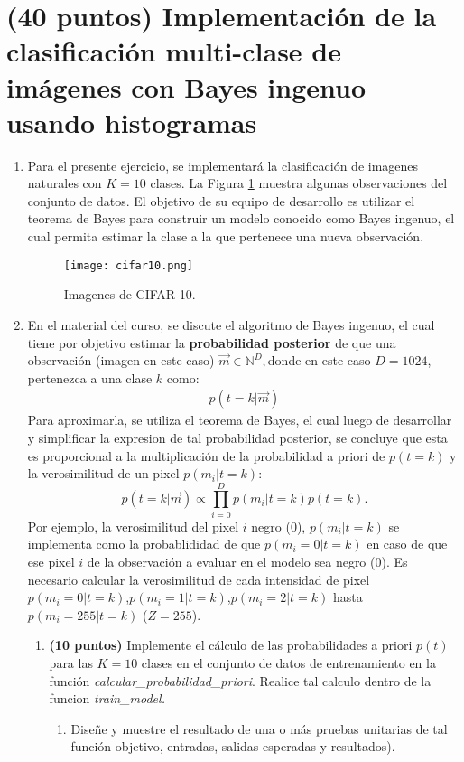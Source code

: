 \documentclass[spanish]{article}
\begin{document}
\section{(40 puntos) Implementación de la clasificación multi-clase de imágenes
con Bayes ingenuo usando histogramas}
\begin{enumerate}
\item Para el presente ejercicio, se implementará la clasificación de imagenes
naturales con $K=10$ clases. La Figura \ref{fig:Imagenes-de-CIFAR-10.}
muestra algunas observaciones del conjunto de datos. El objetivo de
su equipo de desarrollo es utilizar el teorema de Bayes para construir
un modelo conocido como Bayes ingenuo, el cual permita estimar la
clase a la que pertenece una nueva observación.

\begin{figure}
\begin{centering}
\texttt{[image: cifar10.png]}
\par\end{centering}
\caption{Imagenes de CIFAR-10.\label{fig:Imagenes-de-CIFAR-10.}}

\end{figure}

\item En el material del curso, se discute el algoritmo de Bayes ingenuo,
el cual tiene por objetivo estimar la \textbf{probabilidad posterior}
de que una observación (imagen en este caso) $\overrightarrow{m}\in\mathbb{N}^{D},$donde
en este caso $D=1024$, pertenezca a una clase $k$ como:
\[
\begin{array}{c}
p\left(t=k|\overrightarrow{m}\right)\end{array}
\]
Para aproximarla, se utiliza el teorema de Bayes, el cual luego de
desarrollar y simplificar la expresion de tal probabilidad posterior,
se concluye que esta es proporcional a la multiplicación de la probabilidad
a priori de $p\left(t=k\right)$ y la verosimilitud de un pixel $p\left(m_{i}|t=k\right)$:
\[
p\left(t=k|\overrightarrow{m}\right)\propto\prod_{i=0}^{D}p\left(m_{i}|t=k\right)p\left(t=k\right).
\]
Por ejemplo, la verosimilitud del pixel $i$ negro (0), $p\left(m_{i}|t=k\right)$
se implementa como la probablididad de que $p\left(m_{i}=0|t=k\right)$
en caso de que ese pixel $i$ de la observación a evaluar en el modelo
sea negro (0). Es necesario calcular la verosimilitud de cada intensidad
de pixel $p\left(m_{i}=0|t=k\right)$,$p\left(m_{i}=1|t=k\right)$,$p\left(m_{i}=2|t=k\right)$
hasta $p\left(m_{i}=255|t=k\right)$ ($Z=255$). 
\begin{enumerate}
\item \textbf{(10 puntos)} Implemente el cálculo de las probabilidades a
priori $p\left(t\right)$ para las $K=10$ clases en el conjunto de
datos de entrenamiento en la función \emph{calcular\_probabilidad\_priori}.
Realice tal calculo dentro de la funcion \emph{train\_model. }
\begin{enumerate}
\item Diseñe y muestre el resultado de una o más pruebas unitarias de tal
función objetivo, entradas, salidas esperadas y resultados). 
\end{enumerate}


\end{enumerate}
\end{enumerate}
\end{document}
